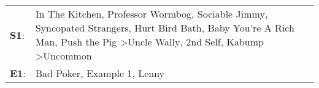\begin{supertabular}{p{0.03\textwidth}p{0.92\textwidth}}
 \textbf{S1}:  &  In The Kitchen\textsuperscript{}, \enspace Professor Wormbog\textsuperscript{}, \enspace Sociable Jimmy\textsuperscript{}, \enspace Syncopated Strangers\textsuperscript{}, \enspace Hurt Bird Bath\textsuperscript{}, \enspace Baby You're A Rich Man\textsuperscript{}, \enspace Push the Pig\textsuperscript{} \textgreater \enspace Uncle Wally\textsuperscript{}, \enspace 2nd Self\textsuperscript{}, \enspace Kabump\textsuperscript{} \textgreater \enspace Uncommon\textsuperscript{}  \enspace  \\
 \textbf{E1}:  &                                                                                                                                                                                                                                                                                                                                                                                             Bad Poker\textsuperscript{}, \enspace Example 1\textsuperscript{}, \enspace Lenny\textsuperscript{}  \enspace  \\
\end{supertabular}
